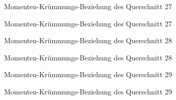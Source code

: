 \documentclass[
  11pt,
  letterpaper,
]{scrreprt}
\begin{document}
\begin{figure}[H]


\caption{\label{fig-qs_27}Momenten-Krümmungs-Beziehung des Querschnitt
27}

\end{figure}%

\begin{figure}[H]


\caption{\label{fig-m_chi_27}Momenten-Krümmungs-Beziehung des
Querschnitt 27}

\end{figure}%

\begin{figure}[H]


\caption{\label{fig-qs_28}Momenten-Krümmungs-Beziehung des Querschnitt
28}

\end{figure}%

\begin{figure}[H]


\caption{\label{fig-m_chi_28}Momenten-Krümmungs-Beziehung des
Querschnitt 28}

\end{figure}%

\begin{figure}[H]


\caption{\label{fig-qs_29}Momenten-Krümmungs-Beziehung des Querschnitt
29}

\end{figure}%

\begin{figure}[H]


\caption{\label{fig-m_chi_29}Momenten-Krümmungs-Beziehung des
Querschnitt 29}

\end{figure}%
\end{document}

